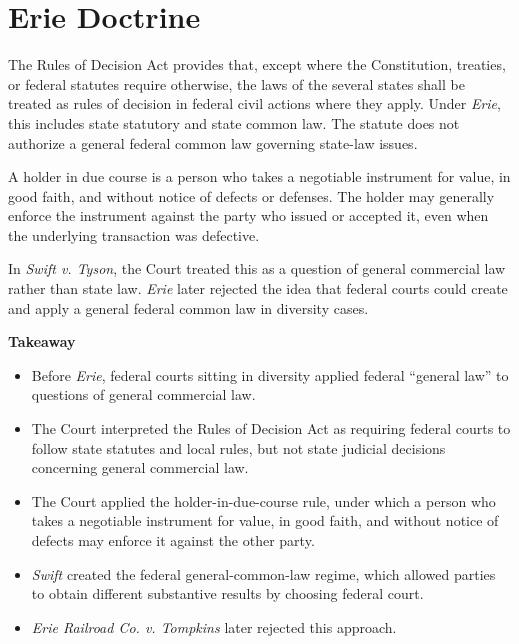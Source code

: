 \documentclass[11pt]{tex/lawoutline}
\begin{document}
\chapter{Erie Doctrine}

{
The Rules of Decision Act provides that, except where the Constitution, treaties, or federal statutes require otherwise, the laws of the several states shall be treated as rules of decision in federal civil actions where they apply. Under \textit{Erie}, this includes state statutory and state common law. The statute does not authorize a general federal common law governing state-law issues.
}

{
A holder in due course is a person who takes a negotiable instrument for value, in good faith, and without notice of defects or defenses. The holder may generally enforce the instrument against the party who issued or accepted it, even when the underlying transaction was defective.

In \textit{Swift v. Tyson}, the Court treated this as a question of general commercial law rather than state law. \textit{Erie} later rejected the idea that federal courts could create and apply a general federal common law in diversity cases.
}

{
\textbf{Takeaway}
\begin{itemize}
    \item Before \textit{Erie}, federal courts sitting in diversity applied federal ``general law'' to questions of general commercial law.
    \item The Court interpreted the Rules of Decision Act as requiring federal courts to follow state statutes and local rules, but not state judicial decisions concerning general commercial law.
    \item The Court applied the holder-in-due-course rule, under which a person who takes a negotiable instrument for value, in good faith, and without notice of defects may enforce it against the other party.
    \item \textit{Swift} created the federal general-common-law regime, which allowed parties to obtain different substantive results by choosing federal court.
    \item \textit{Erie Railroad Co. v. Tompkins} later rejected this approach.
\end{itemize}
}
\end{document}
